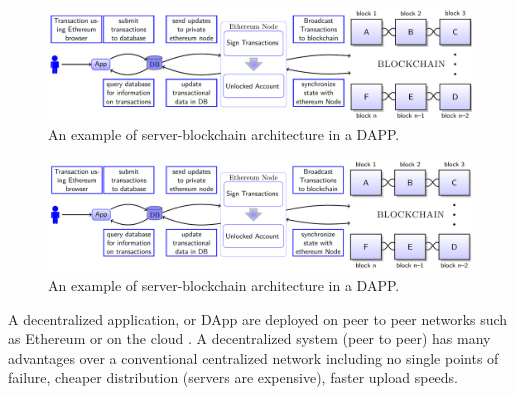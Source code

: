 	
	\begin{warpprint}
	\begin{figure}[ht]
	\includegraphics[width=1\linewidth]{Diagrams/blockchainInSimpleApp.pdf}
	\caption{An example of server-blockchain architecture in a DAPP.}
	\label{fig:DApp}
	\end{figure}
	\end{warpprint}
	
	\begin{warpHTML}
	\begin{figure}[ht]
	\includegraphics[width=1.2\linewidth]{Diagrams/blockchainInSimpleApp.svg}
	\caption{An example of server-blockchain architecture in a DAPP.}
	\label{fig:DApp}
	\end{figure}
	\end{warpHTML}
	
	A decentralized application, or DApp are deployed on peer to peer networks such as Ethereum or on the cloud \footnotemark. A decentralized system (peer to peer) has many advantages over a conventional centralized network including no single points of failure, cheaper distribution (servers are expensive), faster upload speeds. 
	
